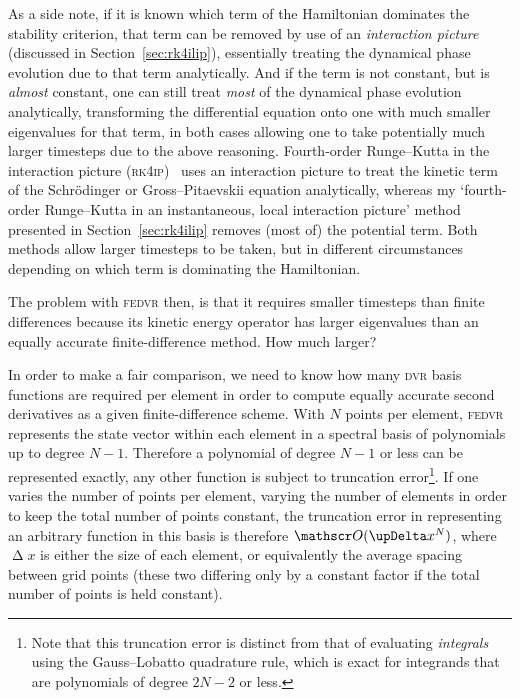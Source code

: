 As a side note, if it is known which term of the Hamiltonian dominates the stability criterion, that term can be removed by use of an \emph{interaction picture} (discussed in Section~\ref{sec:rk4ilip}), essentially treating the dynamical phase evolution due to that term analytically. And if the term is not constant, but is \emph{almost} constant, one can still treat \emph{most} of the dynamical phase evolution analytically, transforming the differential equation onto one with much smaller eigenvalues for that term, in both cases allowing one to take potentially much larger timesteps due to the above reasoning. Fourth-order Runge--Kutta in the interaction picture (\textsc{rk4ip})~\cite{caradoc_davies_thesis} uses an interaction picture to treat the kinetic term of the Schr\"odinger or Gross--Pitaevskii equation analytically, whereas my `fourth-order Runge--Kutta in an instantaneous, local interaction picture' method presented in Section~\ref{sec:rk4ilip} removes (most of) the potential term. Both methods allow larger timesteps to be taken, but in different circumstances depending on which term is dominating the Hamiltonian.

The problem with \textsc{fedvr} then, is that it requires smaller timesteps than finite differences because its kinetic energy operator has larger eigenvalues than an equally accurate finite-difference method. How much larger?

In order to make a fair comparison, we need to know how many \textsc{dvr} basis functions are required per element in order to compute equally accurate second derivatives as a given finite-difference scheme. With $N$ points per element, \textsc{fedvr} represents the state vector within each element in a spectral basis of polynomials up to degree $N - 1$. Therefore a polynomial of degree $N - 1$ or less can be represented exactly, any other function is subject to truncation error\footnote{Note that this truncation error is distinct from that of evaluating \emph{integrals} using the Gauss--Lobatto quadrature rule, which is exact for integrands that are polynomials of degree $2N - 2$ or less.}. If one varies the number of points per element, varying the number of elements in order to keep the total number of points constant, the truncation error in representing an arbitrary function in this basis is therefore $\Ord{\upDelta x^N}$, where $\upDelta x$ is either the size of each element, or equivalently the average spacing between grid points (these two differing only by a constant factor if the total number of points is held constant).

